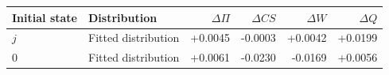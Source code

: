 \begin{tabular}{llrrrr}\toprule
Initial state & Distribution & $\Delta\Pi$ & $\Delta CS$ & $\Delta W$ & $\Delta Q$\\\midrule
$j$ & Fitted distribution & +0.0045 & -0.0003 & +0.0042 & +0.0199 \\
$0$ & Fitted distribution & +0.0061 & -0.0230 & -0.0169 & +0.0056 \\
\bottomrule\end{tabular}
